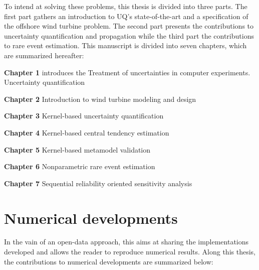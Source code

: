 To intend at solving these problems, this thesis is divided into three parts. 
The first part gathers an introduction to UQ's state-of-the-art and a specification of the offshore wind turbine problem.
The second part presents the contributions to uncertainty quantification and propagation while the third part the contributions to rare event estimation.
This manuscript is divided into seven chapters, which are summarized hereafter: 

\textbf{Chapter 1} introduces the Treatment of uncertainties in computer experiments. Uncertainty quantification 

\textbf{Chapter 2} Introduction to wind turbine modeling and design

\textbf{Chapter 3} Kernel-based uncertainty quantification

\textbf{Chapter 4} Kernel-based central tendency estimation

\textbf{Chapter 5} Kernel-based metamodel validation

\textbf{Chapter 6} Nonparametric rare event estimation

\textbf{Chapter 7} Sequential reliability oriented sensitivity analysis


\clearpage
\section*{Numerical developments}


In the vain of an open-data approach, this aims at sharing the implementations developed and allows the reader to reproduce numerical results.
Along this thesis, the contributions to numerical developments are summarized below: 


